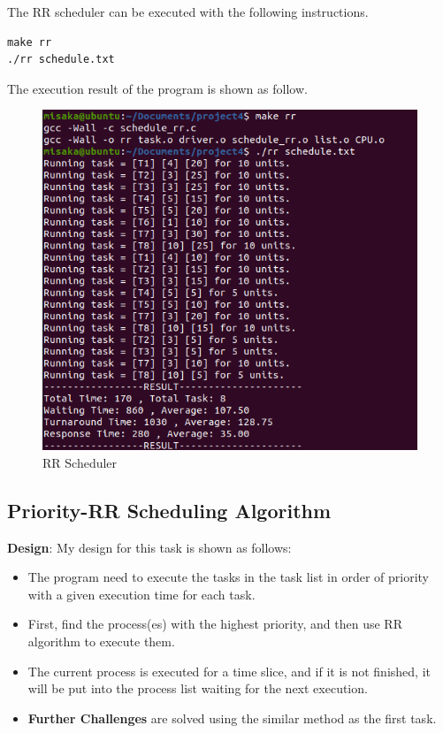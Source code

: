 \documentclass[UTF8,10pt,a4paper]{article}
\theoremstyle{Problem}
\theoremstyle{Solution}
\begin{document}
The RR scheduler can be executed with the following instructions.
\begin{lstlisting}
make rr
./rr schedule.txt
\end{lstlisting}

The execution result of the program is shown as follow.

\begin{figure}[H]
    \centering
    \includegraphics[width=400pt]{3rr.png}
    \caption{RR Scheduler}
    \label{3}
\end{figure}

\subsection{Priority-RR Scheduling Algorithm}

\textbf{Design}: My design for this task is shown as follows:

\begin{itemize}
    \item The program need to execute the tasks in the task list in order of priority with a given execution time for each task. 
    \item First, find the process(es) with the highest priority, and then use RR algorithm to execute them.
    \item The current process is executed for a time slice, and if it is not finished, it will be put into the process list waiting for the next execution.
    \item \textbf{Further Challenges} are solved using the similar method as the first task.
\end{itemize}
\end{document}
